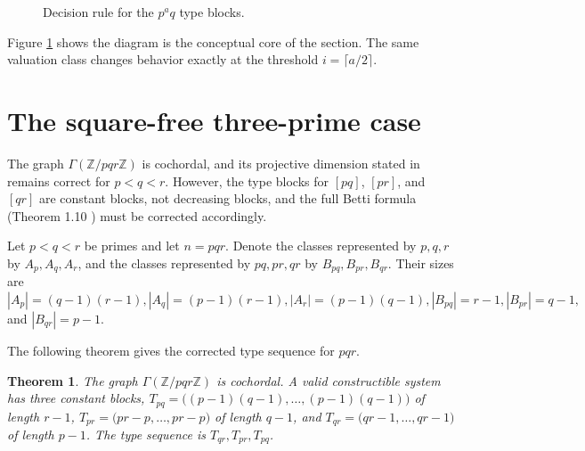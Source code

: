 \documentclass[12pt]{article}
\newtheorem{theorem}{Theorem}[section]
\theoremstyle{definition}
\begin{document}
\medskip

\begin{figure}[H]
\centering
{}
\caption{Decision rule for the $p^a q$ type blocks.}
\label{fig:two-prime-flow}
\end{figure}

\medskip

Figure \ref{fig:two-prime-flow} shows the diagram is the conceptual core of the section.  The same valuation class changes behavior exactly at the threshold $i=\lceil a/2\rceil$.

\medskip

\section{The square-free three-prime case}\label{sec:three-prime}
 The graph $\Gamma(\mathbb{Z}/pqr\mathbb{Z})$ is cochordal, and its projective dimension stated in \cite{DungVu2026} remains correct for $p<q<r$.  However, the type blocks for $[pq]$, $[pr]$, and $[qr]$ are constant blocks, not decreasing blocks, and the full Betti formula (Theorem 1.10 \cite{DungVu2026}) must be corrected accordingly.

\medskip

Let $p<q<r$ be primes and let $n=pqr$.  Denote the classes represented by $p,q,r$ by $A_p,A_q,A_r$, and the classes represented by $pq,pr,qr$ by $B_{pq},B_{pr},B_{qr}$.  Their sizes are
$ |A_p|=(q-1)(r-1), |A_q|=(p-1)(r-1), |A_r|=(p-1)(q-1), 
|B_{pq}|=r-1, |B_{pr}|=q-1,$ and $ |B_{qr}|=p-1.
$

\medskip

\noindent The following theorem gives the corrected type sequence for $pqr$.
\begin{theorem}\label{thm:three-prime-type}
The graph $\Gamma(\mathbb{Z}/pqr\mathbb{Z})$ is cochordal.  A valid constructible system has three constant blocks, 
$ T_{pq}=\bigl((p-1)(q-1),\ldots,(p-1)(q-1)\bigr) $
of length $r-1$, $
T_{pr}=\bigl(pr-p,\ldots,pr-p\bigr) $
of length $q-1$, and $
T_{qr}=\bigl(qr-1,\ldots,qr-1\bigr) $
of length $p-1$.  The type sequence is $T_{qr},T_{pr},T_{pq}$.
\end{theorem}
\end{document}
